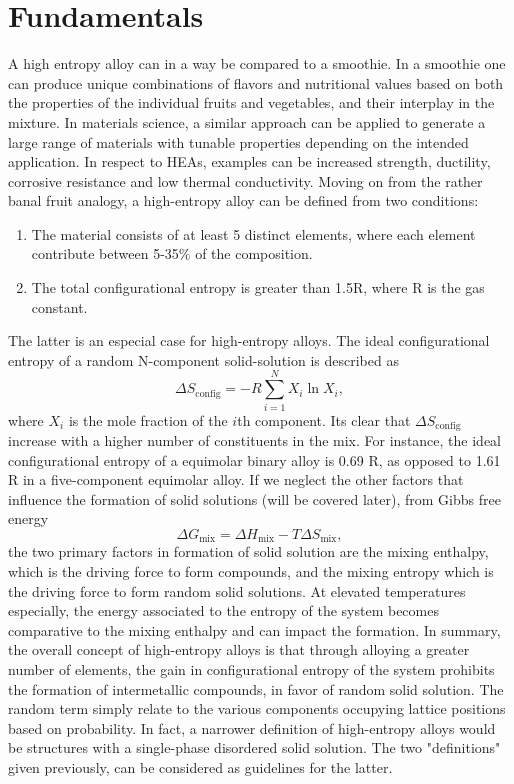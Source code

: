 \section{Fundamentals} 
A high entropy alloy can in a way be compared to a smoothie. In a smoothie one can produce unique combinations of flavors and nutritional values based on both the properties of the individual fruits and vegetables, and their interplay in the mixture. In materials science, a similar approach can be applied to generate a large range of materials with tunable properties depending on the intended application. In respect to HEAs, examples can be increased strength, ductility, corrosive resistance and low thermal conductivity. Moving on from the rather banal fruit analogy, a high-entropy alloy can be defined from two conditions:
\begin{enumerate}
    \item The material consists of at least 5 distinct elements, where each element contribute between 5-35$\%$ of the composition.
    \item The total configurational entropy is greater than 1.5R, where R is the gas constant. 
\end{enumerate}
The latter is an especial case for high-entropy alloys. The ideal configurational entropy of a random N-component solid-solution is described as
\begin{equation}
\Delta S_{\text{config}} = -R \sum_{i=1}^{N}X_i\ln X_i,
\end{equation}
where $X_i$ is the mole fraction of the $i$th component. Its clear that $\Delta S_{\text{config}}$ increase with a higher number of constituents in the mix. For instance, the ideal configurational entropy of a equimolar binary alloy is 0.69 R, as opposed to 1.61 R in a five-component equimolar alloy. If we neglect the other factors that influence the formation of solid solutions (will be covered later), from Gibbs free energy
\begin{equation}
\Delta G_{\text{mix}} = \Delta H_{\text{mix}} - T\Delta S_{\text{mix}},
\end{equation} 
the two primary factors in formation of solid solution are the mixing enthalpy, which is the driving force to form compounds, and the mixing entropy which is the driving force to form random solid solutions. At elevated temperatures especially, the energy associated to the entropy of the system becomes comparative to the mixing enthalpy and can impact the formation. In summary, the overall concept of high-entropy alloys is that through alloying a greater number of elements, the gain in configurational entropy of the system prohibits the formation of intermetallic compounds, in favor of random solid solution. The random term simply relate to the various components occupying lattice positions based on probability. In fact, a narrower definition of high-entropy alloys would be structures with a single-phase disordered solid solution. The two "definitions" given previously, can be considered as guidelines for the latter.
 
